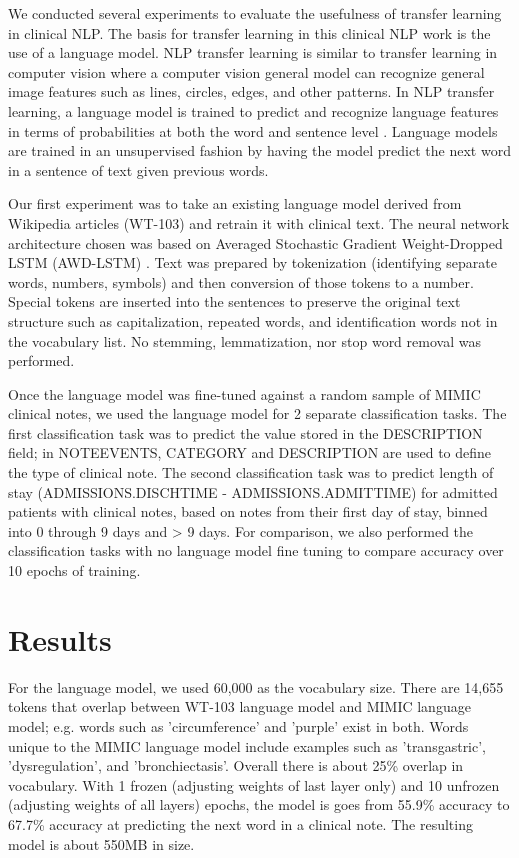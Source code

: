 \documentclass{amia}
\begin{document}
We conducted several experiments to evaluate the usefulness of transfer learning in clinical NLP. The basis for transfer learning in this clinical NLP work is the use of a language model. NLP transfer learning is similar to transfer learning in computer vision where a computer vision general model can recognize general image features such as lines, circles, edges, and other patterns. In NLP transfer learning, a language model is trained to predict and recognize language features in terms of probabilities at both the word and sentence level \cite{Bengio:2003:NPL:944919.944966}. Language models are trained in an unsupervised fashion by having the model predict the next word in a sentence of text given previous words.

Our first experiment was to take an existing language model derived from Wikipedia articles (WT-103) \cite{Merity2016Sep} and retrain it with clinical text. The neural network architecture chosen was based on Averaged Stochastic Gradient Weight-Dropped LSTM (AWD-LSTM) \cite{Merity2017Aug}. Text was prepared by tokenization (identifying separate words, numbers, symbols) and then conversion of those tokens to a number. Special tokens are inserted into the sentences to preserve the original text structure such as capitalization, repeated words, and identification words not in the vocabulary list. No stemming, lemmatization, nor stop word removal was performed.

Once the language model was fine-tuned against a random sample of MIMIC clinical notes, we used the language model for 2 separate classification tasks. The first classification task was to predict the value stored in the DESCRIPTION field; in NOTEEVENTS, CATEGORY and DESCRIPTION are used to define the type of clinical note. The second classification task was to predict length of stay (ADMISSIONS.DISCHTIME - ADMISSIONS.ADMITTIME) for admitted patients with clinical notes, based on notes from their first day of stay, binned into 0 through 9 days and > 9 days. For comparison, we also performed the classification tasks with no language model fine tuning to compare accuracy over 10 epochs of training.

\section*{Results}

For the language model, we used 60,000 as the vocabulary size. There are 14,655 tokens that overlap between WT-103 language model and MIMIC language model; e.g. words such as 'circumference' and 'purple' exist in both. Words unique to the MIMIC language model include examples such as 'transgastric', 'dysregulation', and 'bronchiectasis'. Overall there is about 25\% overlap in vocabulary. With 1 frozen (adjusting weights of last layer only) and 10 unfrozen (adjusting weights of all layers) epochs, the model is goes from 55.9\% accuracy to 67.7\% accuracy at predicting the next word in a clinical note. The resulting model is about 550MB in size.
\end{document}

